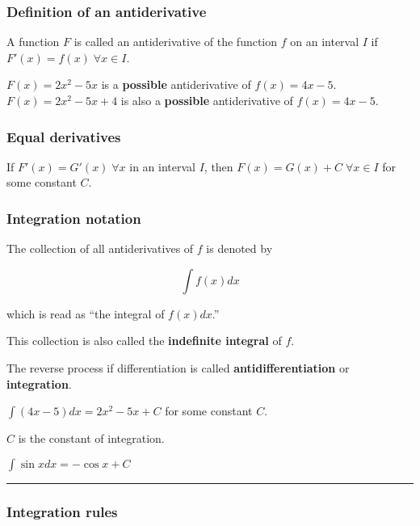 \documentclass[
]{article}
\begin{document}
\hypertarget{definition-of-an-antiderivative}{%
\subsubsection{Definition of an
antiderivative}\label{definition-of-an-antiderivative}}

A function \(F\) is called an antiderivative of the function \(f\) on an
interval \(I\) if \(F'(x) = f(x) \;\forall x \in I\).

\(F(x)=2x^2-5x\) is a \textbf{possible} antiderivative of \(f(x)=4x-5\).
\(F(x)=2x^2-5x+4\) is also a \textbf{possible} antiderivative of
\(f(x)=4x-5\).

\hypertarget{equal-derivatives-1}{%
\subsubsection{Equal derivatives}\label{equal-derivatives-1}}

If \(F'(x)=G'(x) \;\forall x\) in an interval \(I\), then
\(F(x) = G(x) + C \;\forall x \in I\) for some constant \(C\).

\hypertarget{integration-notation}{%
\subsubsection{Integration notation}\label{integration-notation}}

The collection of all antiderivatives of \(f\) is denoted by

\[ \int f(x)dx \]

which is read as ``the integral of \(f(x)dx\).''

This collection is also called the \textbf{indefinite integral} of
\(f\).

The reverse process if differentiation is called
\textbf{antidifferentiation} or \textbf{integration}.

\(\displaystyle\int (4x-5)dx = 2x^2-5x+C\) for some constant \(C\).

\(C\) is the constant of integration.

\(\displaystyle\int \sin xdx = -\cos x+C\)

\begin{center}\rule{0.5\linewidth}{0.5pt}\end{center}

\hypertarget{integration-rules}{%
\subsubsection{Integration rules}\label{integration-rules}}
\end{document}
